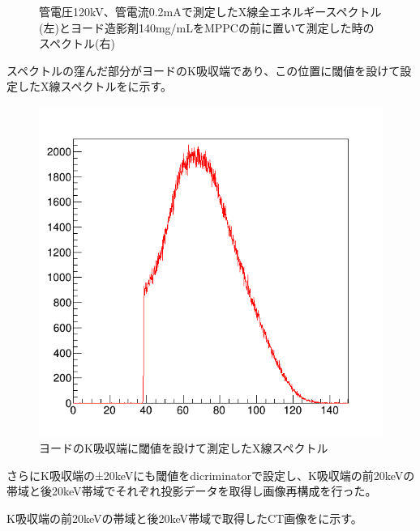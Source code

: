 \begin{figure}[H]
\begin{minipage}{0.5\hsize}
\begin{center}
  \end{center}
 \end{minipage}
 \begin{center}
  \caption{管電圧120kV、管電流0.2mAで測定したX線全エネルギースペクトル(左)とヨード造影剤140mg/mLをMPPCの前に置いて測定した時のスペクトル(右)}
  \label{fig:Iodine_spectrums}
  \end{center}
\end{figure}

スペクトルの窪んだ部分がヨードのK吸収端であり、この位置に閾値を設けて設定したX線スペクトルをに示す。\\

\begin{figure}[H]
 \begin{center}
 \includegraphics[bb=0.000000 0.000000 596.000000 574.000000,width=0.5\hsize]{image2/chapter5/over_I_kedge_100sec.png} 
 \end{center}
 \caption{ヨードのK吸収端に閾値を設けて測定したX線スペクトル}
 \label{fig:over_I_kedge}
\end{figure}

さらにK吸収端の±20keVにも閾値をdicriminatorで設定し、K吸収端の前20keVの帯域と後20keV帯域でそれぞれ投影データを取得し画像再構成を行った。

K吸収端の前20keVの帯域と後20keV帯域で取得したCT画像をに示す。

